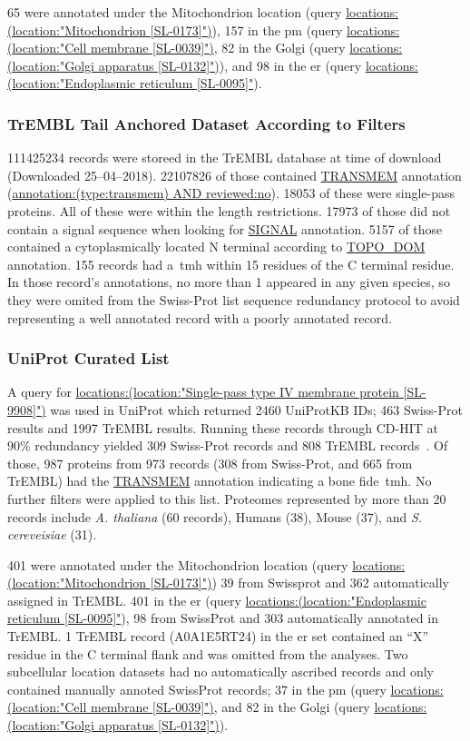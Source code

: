 65 were annotated under the Mitochondrion location (query \url{locations:(location:"Mitochondrion [SL-0173]")}), 157 in the \gls{pm} (query \url{locations:(location:"Cell membrane [SL-0039]")}, 82 in the Golgi (query \url{locations:(location:"Golgi apparatus [SL-0132]")}), and 98 in the \gls{er} (query \url{locations:(location:"Endoplasmic reticulum [SL-0095]"}).

\subsubsection{TrEMBL Tail Anchored Dataset According to Filters}
111425234 records were storeed in the TrEMBL database at time of download (Downloaded 25--04--2018).
22107826 of those contained \url{TRANSMEM} annotation (\url{annotation:(type:transmem) AND reviewed:no}).
18053 of these were single-pass proteins.
All of these were within the length restrictions.
17973 of those did not contain a signal sequence when looking for \url{SIGNAL} annotation.
5157 of those contained a cytoplasmically located N terminal according to \url{TOPO_DOM} annotation.
155 records had a~\gls{tmh} within 15 residues of the C terminal residue.
In those record's annotations, no more than 1 appeared in any given species, so they were omited from the Swiss-Prot list sequence redundancy protocol to avoid representing a well annotated record with a poorly annotated record.

\subsubsection{UniProt Curated List}
A query for \url{locations:(location:"Single-pass type IV membrane protein [SL-9908]")} was used in UniProt which returned 2460 UniProtKB IDs; 463 Swiss-Prot results and 1997 TrEMBL results.
Running these records through CD-HIT at 90\% redundancy yielded 309 Swiss-Prot records and 808 TrEMBL records~\cite{Huang2010, Wu2011}.
Of those, 987 proteins from 973 records (308 from Swiss-Prot, and 665 from TrEMBL) had the \url{TRANSMEM} annotation indicating a bone fide~\gls{tmh}.
No further filters were applied to this list.
Proteomes represented by more than 20 records include \textit{A. thaliana} (60 records), Humans (38), Mouse (37), and \textit{S. cereveisiae} (31). %

401 were annotated under the Mitochondrion location (query \url{locations:(location:"Mitochondrion [SL-0173]")}) 39 from Swissprot and 362 automatically assigned in TrEMBL.
401 in the \gls{er} (query \url{locations:(location:"Endoplasmic reticulum [SL-0095]"}), 98 from SwissProt and 303 automatically annotated in TrEMBL.
1 TrEMBL record (A0A1E5RT24) in the \gls{er} set contained an ``X'' residue in the C terminal flank and was omitted from the analyses.
Two subcellular location datasets had no automatically ascribed records and only contained manually annoted SwissProt records; 37 in the \gls{pm} (query \url{locations:(location:"Cell membrane [SL-0039]")}, and 82 in the Golgi (query \url{locations:(location:"Golgi apparatus [SL-0132]")}).

